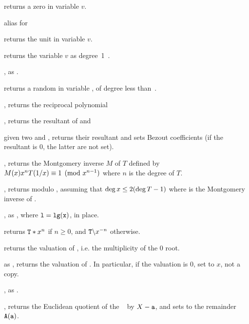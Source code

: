 
 returns a zero  in variable $v$.

 alias for 

 returns the unit  in variable $v$.

 returns the variable $v$ as degree~1~.

, as .

 returns a random 
in variable , of degree less than~.

, returns the reciprocal polynomial

, returns the resultant
of  and 

given two   and ,
returns their resultant and sets Bezout coefficients (if the resultant is 0,
the latter are not set).

, returns the Montgomery inverse
$M$ of $T$ defined by $M(x)\*x^n\*T(1/x)\equiv 1\pmod{x^{n-1}}$ where $n$ is
the degree of $T$.

, returns 
modulo , assuming that $\deg x\leq 2\*(\deg{T} - 1)$ where  is
the Montgomery inverse of .

, as , where
${\tt l} = {\tt lg(x)}$, in place.

 returns ${\tt T} * x^n$ if $n\geq 0$,
and $\kbd{T} \bs x^{-n}$ otherwise.

 returns the valuation of , i.e. the
multiplicity of the $0$ root.

 as , returns the
valuation of . In particular, if the valuation is $0$, set 
to $x$, not a copy.

, as
.

, returns the
Euclidean quotient of the ~ by $X - {\tt a}$, and sets
 to the remainder $ {\tt A}({\tt a})$.

